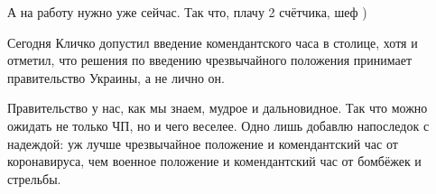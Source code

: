 А на работу нужно уже сейчас. Так что, плачу 2 счётчика, шеф ) 

Сегодня Кличко допустил введение комендантского часа в столице, хотя и отметил,
что решения по введению чрезвычайного положения принимает правительство
Украины, а не лично он.

Правительство у нас, как мы знаем, мудрое и дальновидное. Так что можно ожидать
не только ЧП, но и чего веселее. Одно лишь добавлю напоследок с надеждой: уж
лучше чрезвычайное положение и комендантский час от коронавируса, чем военное
положение и комендантский час от бомбёжек и стрельбы.
